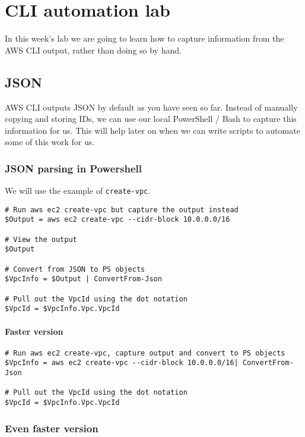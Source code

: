 \chapter{CLI automation lab}


In this week's lab we are going to learn how to capture information from the AWS CLI output, rather than doing so by hand.

\section{JSON}

AWS CLI outputs JSON by default as you have seen so far.
Instead of manually copying and storing IDs, we can use our local PowerShell / Bash to capture this information for us.
This will help later on when we can write scripts to automate some of this work for us.

\subsection{JSON parsing in Powershell}

We will use the example of \texttt{create-vpc}.
\begin{verbatim}
# Run aws ec2 create-vpc but capture the output instead
$Output = aws ec2 create-vpc --cidr-block 10.0.0.0/16

# View the output
$Output

# Convert from JSON to PS objects
$VpcInfo = $Output | ConvertFrom-Json

# Pull out the VpcId using the dot notation
$VpcId = $VpcInfo.Vpc.VpcId
\end{verbatim}

\subsubsection{Faster version}

\begin{verbatim}
# Run aws ec2 create-vpc, capture output and convert to PS objects
$VpcInfo = aws ec2 create-vpc --cidr-block 10.0.0.0/16| ConvertFrom-Json 

# Pull out the VpcId using the dot notation
$VpcId = $VpcInfo.Vpc.VpcId
\end{verbatim}

\subsection{Even faster version}

